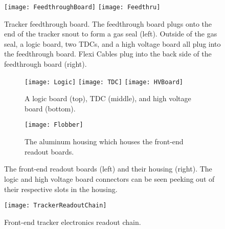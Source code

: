 


\begin{figure}
    \centering
        \texttt{[image: FeedthroughBoard]}
    \hspace{1mm}
        \texttt{[image: Feedthru]}
    \caption[Tracker feedthough board]{Tracker feedthrough board. The feedthrough board plugs onto the end of the tracker snout to form a gas seal (left). Outside of the gas seal, a logic board, two TDCs, and a high voltage board all plug into the feedthrough board. Flexi Cables plug into the back side of the feedthrough board (right).}
    \label{fig:Feedthrough}
\end{figure}

\begin{figure}
    \centering
        \begin{subfigure}[b]{0.45\textwidth}
            \centering
            \texttt{[image: Logic]}
            \texttt{[image: TDC]}
            \texttt{[image: HVBoard]}
            \caption{A logic board (top), TDC (middle), and high voltage board (bottom).}
        \end{subfigure}
    \hspace{5mm}%
        \begin{subfigure}[b]{0.45\textwidth}
            \centering
            \texttt{[image: Flobber]}
            \caption{The aluminum housing which houses the front-end readout boards.}
        \end{subfigure}
    \caption[Tracker readout boards and housing]{The front-end readout boards (left) and their housing (right). The logic and high voltage board connectors can be seen peeking out of their respective slots in the housing.}
\label{fig:FrontEndElectronics}
\end{figure}



\begin{figure}
    \centering
    \texttt{[image: TrackerReadoutChain]}
    \caption[Front-end tracker electronics readout chain]{Front-end tracker electronics readout chain.}   
    \label{fig:TrackerReadoutChain}
\end{figure}



